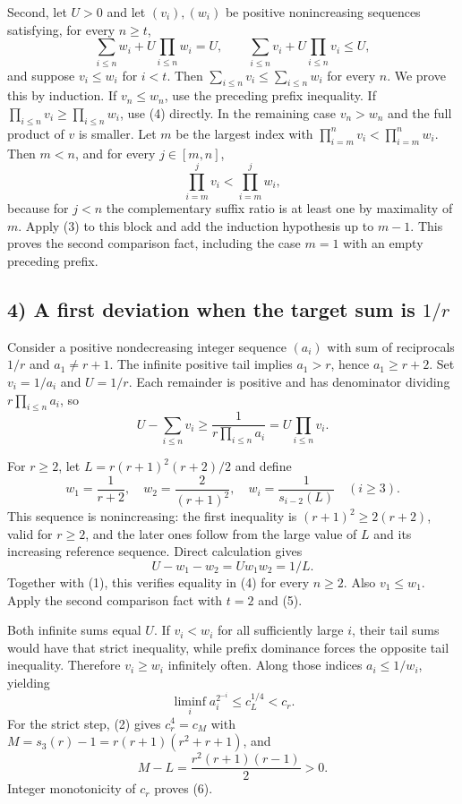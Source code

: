 Second, let $U>0$ and let $(v_i),(w_i)$ be positive nonincreasing sequences satisfying, for every $n\ge t$,
\[
 \sum_{i\le n}w_i+U\prod_{i\le n}w_i=U,
 \qquad \sum_{i\le n}v_i+U\prod_{i\le n}v_i\le U,\tag{4}
\]
and suppose $v_i\le w_i$ for $i<t$. Then $\sum_{i\le n}v_i\le\sum_{i\le n}w_i$ for every $n$. We prove this by induction. If $v_n\le w_n$, use the preceding prefix inequality. If $\prod_{i\le n}v_i\ge\prod_{i\le n}w_i$, use (4) directly. In the remaining case $v_n>w_n$ and the full product of $v$ is smaller. Let $m$ be the largest index with $\prod_{i=m}^n v_i<\prod_{i=m}^n w_i$. Then $m<n$, and for every $j\in[m,n]$,
\[
 \prod_{i=m}^j v_i<\prod_{i=m}^j w_i,
\]
because for $j<n$ the complementary suffix ratio is at least one by maximality of $m$. Apply (3) to this block and add the induction hypothesis up to $m-1$. This proves the second comparison fact, including the case $m=1$ with an empty preceding prefix.

\subsection*{4) A first deviation when the target sum is $1/r$}
Consider a positive nondecreasing integer sequence $(a_i)$ with sum of reciprocals $1/r$ and $a_1\ne r+1$. The infinite positive tail implies $a_1>r$, hence $a_1\ge r+2$. Set $v_i=1/a_i$ and $U=1/r$. Each remainder is positive and has denominator dividing $r\prod_{i\le n}a_i$, so
\[
 U-\sum_{i\le n}v_i\ge\frac1{r\prod_{i\le n}a_i}
 =U\prod_{i\le n}v_i.\tag{5}
\]

For $r\ge2$, let $L=r(r+1)^2(r+2)/2$ and define
\[
 w_1=\frac1{r+2},\quad w_2=\frac2{(r+1)^2},\quad
 w_i=\frac1{s_{i-2}(L)}\quad(i\ge3).
\]
This sequence is nonincreasing: the first inequality is $(r+1)^2\ge2(r+2)$, valid for $r\ge2$, and the later ones follow from the large value of $L$ and its increasing reference sequence. Direct calculation gives
\[
 U-w_1-w_2=Uw_1w_2=1/L.
\]
Together with (1), this verifies equality in (4) for every $n\ge2$. Also $v_1\le w_1$. Apply the second comparison fact with $t=2$ and (5).

Both infinite sums equal $U$. If $v_i<w_i$ for all sufficiently large $i$, their tail sums would have that strict inequality, while prefix dominance forces the opposite tail inequality. Therefore $v_i\ge w_i$ infinitely often. Along those indices $a_i\le1/w_i$, yielding
\[
 \liminf_i a_i^{2^{-i}}\le c_L^{1/4}<c_r.\tag{6}
\]
For the strict step, (2) gives $c_r^4=c_M$ with $M=s_3(r)-1=r(r+1)(r^2+r+1)$, and
\[
 M-L=\frac{r^2(r+1)(r-1)}2>0.
\]
Integer monotonicity of $c_r$ proves (6).

